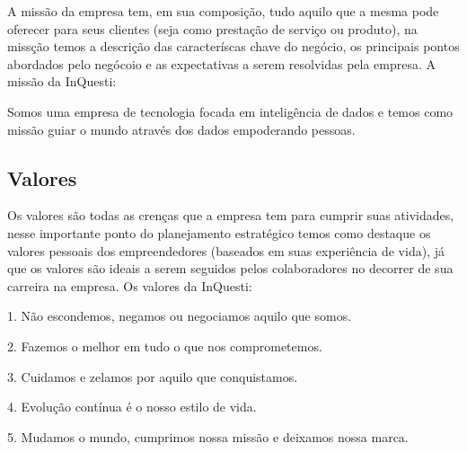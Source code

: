 A missão da empresa tem, em sua composição, tudo aquilo que a mesma pode oferecer para seus clientes (seja como prestação de serviço ou produto), na missção temos a descrição das caracteríscas chave do negócio, os principais pontos abordados pelo negócoio e as expectativas a serem resolvidas pela empresa.
A missão da InQuesti:

Somos uma empresa de tecnologia focada em inteligência de dados e temos como missão guiar o mundo através dos dados empoderando pessoas.

\subsection{Valores}
Os valores são todas as crenças que a empresa tem para cumprir suas atividades, nesse importante ponto do planejamento estratégico temos como destaque os valores pessoais dos empreendedores (baseados em suas experiência de vida), já que os valores são ideais a serem seguidos pelos colaboradores no decorrer de sua carreira na empresa.
Os valores da InQuesti:

1. Não escondemos, negamos ou negociamos aquilo que somos.

2. Fazemos o melhor em tudo o que nos comprometemos.

3. Cuidamos e zelamos por aquilo que conquistamos.

4. Evolução contínua é o nosso estilo de vida.

5. Mudamos o mundo, cumprimos nossa missão e deixamos nossa marca.